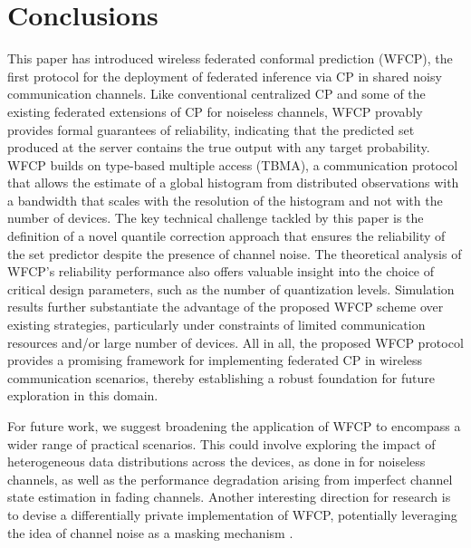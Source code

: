 \documentclass[12pt, draftclsnofoot, onecolumn]{IEEEtran}
\begin{document}
\section{Conclusions}\label{conclusion}

This paper has introduced wireless federated conformal prediction (WFCP), the first protocol for the deployment of federated inference via CP in shared noisy communication channels. Like conventional centralized CP and some of the existing federated extensions of CP for noiseless channels, WFCP provably provides formal guarantees of reliability, indicating that the predicted set produced at the server contains the true output with any target probability. WFCP builds on type-based multiple access (TBMA), a communication protocol that allows the estimate of a global histogram from distributed observations with a bandwidth that scales with the resolution of the histogram and not with the number of devices. The key technical challenge tackled by this paper is the definition of a novel quantile correction approach that ensures the reliability of the set predictor despite the presence of channel noise. The theoretical analysis of WFCP's reliability performance also offers valuable insight into the choice of critical design parameters, such as the number of quantization levels.
Simulation results further substantiate the advantage of the proposed WFCP scheme over existing strategies, particularly under constraints of limited communication resources and/or large number of devices. All in all, the proposed WFCP protocol provides a promising framework for implementing federated CP in wireless communication scenarios, thereby establishing a robust foundation for future exploration in this domain.

For future work, we suggest broadening the application of  WFCP to encompass a wider range of practical scenarios. This could involve exploring the impact of heterogeneous data distributions across the devices, as done in \cite{lu2023federated, plassier2023conformal} for noiseless channels, as well as the performance degradation arising from imperfect channel state estimation in fading channels. Another interesting direction for research is to devise a differentially private implementation of WFCP, potentially leveraging the idea of channel noise as a masking mechanism \cite{liu2020privacy}.

\appendix
\end{document}
